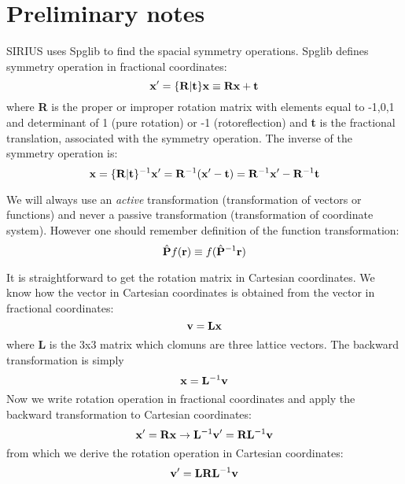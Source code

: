 \hypertarget{sym_section1}{}\section{Preliminary notes}\label{sym_section1}
S\+I\+R\+I\+U\+S uses Spglib to find the spacial symmetry operations. Spglib defines symmetry operation in fractional coordinates\+: \[ {\bf x'} = \{ {\bf R} | {\bf t} \} {\bf x} \equiv {\bf R}{\bf x} + {\bf t} \] where {\bfseries R} is the proper or improper rotation matrix with elements equal to -\/1,0,1 and determinant of 1 (pure rotation) or -\/1 (rotoreflection) and {\bfseries t} is the fractional translation, associated with the symmetry operation. The inverse of the symmetry operation is\+: \[ {\bf x} = \{ {\bf R} | {\bf t} \}^{-1} {\bf x'} = {\bf R}^{-1} ({\bf x'} - {\bf t}) = {\bf R}^{-1} {\bf x'} - {\bf R}^{-1} {\bf t} \]

We will always use an {\itshape active} transformation (transformation of vectors or functions) and never a passive transformation (transformation of coordinate system). However one should remember definition of the function transformation\+: \[ \hat {\bf P} f({\bf r}) \equiv f(\hat {\bf P}^{-1} {\bf r}) \]

It is straightforward to get the rotation matrix in Cartesian coordinates. We know how the vector in Cartesian coordinates is obtained from the vector in fractional coordinates\+: \[ {\bf v} = {\bf L} {\bf x} \] where {\bfseries L} is the 3x3 matrix which clomuns are three lattice vectors. The backward transformation is simply \[ {\bf x} = {\bf L}^{-1} {\bf v} \] Now we write rotation operation in fractional coordinates and apply the backward transformation to Cartesian coordinates\+: \[ {\bf x'} = {\bf R}{\bf x} \rightarrow {\bf L}^{-1} {\bf v'} = {\bf R} {\bf L}^{-1} {\bf v} \] from which we derive the rotation operation in Cartesian coordinates\+: \[ {\bf v'} = {\bf L} {\bf R} {\bf L}^{-1} {\bf v} \] 